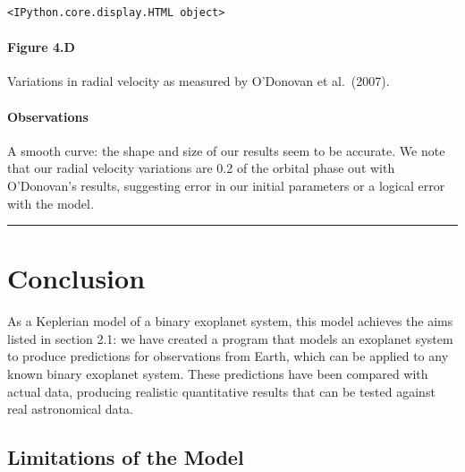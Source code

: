 \documentclass[11pt]{article}
\begin{document}
    
    
    \begin{Verbatim}[commandchars=\\\{\}]
<IPython.core.display.HTML object>
    \end{Verbatim}

    
    

    \hypertarget{figure-4.d}{%
\paragraph{Figure 4.D}\label{figure-4.d}}

Variations in radial velocity as measured by O'Donovan et al.~(2007).

    \hypertarget{observations}{%
\paragraph{Observations}\label{observations}}

A smooth curve: the shape and size of our results seem to be accurate.
We note that our radial velocity variations are 0.2 of the orbital phase
out with O'Donovan's results, suggesting error in our initial parameters
or a logical error with the model.\\

\begin{center}\rule{0.5\linewidth}{0.5pt}\end{center}

    \hypertarget{conclusion}{%
\section{Conclusion}\label{conclusion}}



As a Keplerian model of a binary exoplanet system, this model achieves
the aims listed in section 2.1: we have created a program that models an
exoplanet system to produce predictions for observations from Earth,
which can be applied to any known binary exoplanet system. These
predictions have been compared with actual data, producing realistic
quantitative results that can be tested against real astronomical data.

\hypertarget{limitations-of-the-model}{%
\subsection{Limitations of the Model}\label{limitations-of-the-model}}
\end{document}
